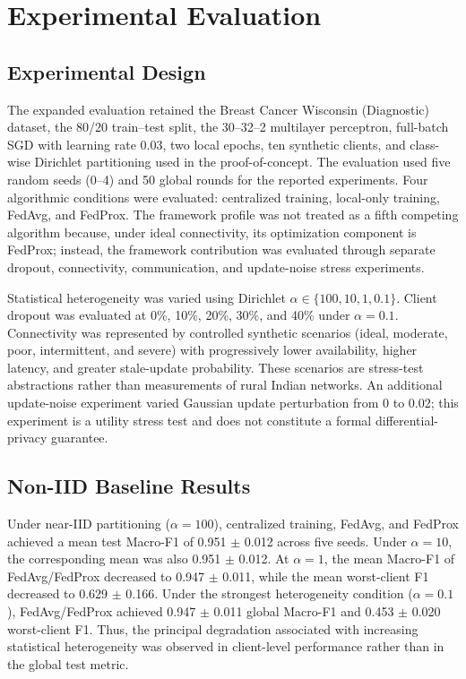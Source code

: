 \section{Experimental Evaluation}
\subsection{Experimental Design}
The expanded evaluation retained the Breast Cancer Wisconsin (Diagnostic) dataset, the 80/20 train--test split, the 30--32--2 multilayer perceptron, full-batch SGD with learning rate 0.03, two local epochs, ten synthetic clients, and class-wise Dirichlet partitioning used in the proof-of-concept. The evaluation used five random seeds (0--4) and 50 global rounds for the reported experiments. Four algorithmic conditions were evaluated: centralized training, local-only training, FedAvg, and FedProx. The framework profile was not treated as a fifth competing algorithm because, under ideal connectivity, its optimization component is FedProx; instead, the framework contribution was evaluated through separate dropout, connectivity, communication, and update-noise stress experiments.

Statistical heterogeneity was varied using Dirichlet $\alpha\in\{100,10,1,0.1\}$. Client dropout was evaluated at 0\%, 10\%, 20\%, 30\%, and 40\% under $\alpha=0.1$. Connectivity was represented by controlled synthetic scenarios (ideal, moderate, poor, intermittent, and severe) with progressively lower availability, higher latency, and greater stale-update probability. These scenarios are stress-test abstractions rather than measurements of rural Indian networks. An additional update-noise experiment varied Gaussian update perturbation from 0 to 0.02; this experiment is a utility stress test and does not constitute a formal differential-privacy guarantee.

\subsection{Non-IID Baseline Results}
Under near-IID partitioning ($\alpha=100$), centralized training, FedAvg, and FedProx achieved a mean test Macro-F1 of 0.951 $\pm$ 0.012 across five seeds. Under $\alpha=10$, the corresponding mean was also 0.951 $\pm$ 0.012. At $\alpha=1$, the mean Macro-F1 of FedAvg/FedProx decreased to 0.947 $\pm$ 0.011, while the mean worst-client F1 decreased to 0.629 $\pm$ 0.166. Under the strongest heterogeneity condition ($\alpha=0.1$), FedAvg/FedProx achieved 0.947 $\pm$ 0.011 global Macro-F1 and 0.453 $\pm$ 0.020 worst-client F1. Thus, the principal degradation associated with increasing statistical heterogeneity was observed in client-level performance rather than in the global test metric.

